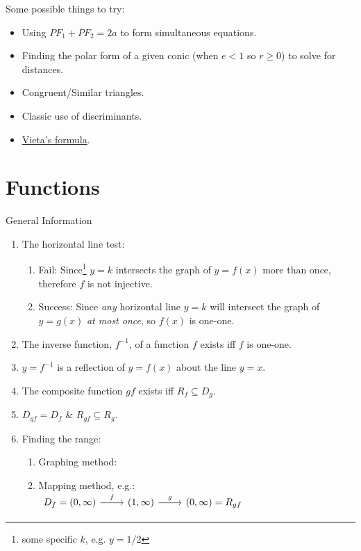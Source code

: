 \documentclass[oneside]{book}
\begin{document}
  \begin{note}
    Some possible things to try:
    \begin{itemize}
      \item Using \(PF_1+PF_2=2a\) to form simultaneous equations.
      \item Finding the polar form of a given conic (when \(e<1\) so \(r \geq 0\)) to solve for distances.
      \item Congruent/Similar triangles.
      \item Classic use of discriminants.
      \item \hyperlink{vieta}{Vieta's formula}.
    \end{itemize}
  \end{note}
\chapter{Functions}
\begin{stbox}{General Information}
  \begin{enumerate}
    \item The horizontal line test: 
    \begin{enumerate}
      \item Fail: Since\footnote{some specific \(k\), e.g. \(y=1/2\)} \(y=k\) intersects the graph of \(y=f(x)\) more than once, therefore \(f\) is not injective.
      \item Success: Since \emph{any} horizontal line \(y=k\) will intersect the graph of \(y=g(x)\) \emph{at most once}, so \(f(x)\) is one-one.
    \end{enumerate}  
    \item The inverse function, \(f^{-1}\), of a function \(f\) exists iff \(f\) is one-one.
    \item \(y=f^{-1}\) is a reflection of \(y=f(x)\) about the line \(y=x\).
    \item The composite function \(gf\) exists iff \(R_f \subseteq D_g\).
    \item \(D_{gf}=D_f\) \& \(R_{gf}\subseteq R_g\).
    \item Finding the range:
    \begin{enumerate}
      \item Graphing method:
      \item Mapping method, e.g.: \(\begin{tikzcd}
        {D_f=(0, \infty)} & {(1,\infty)} & {(0,\infty)=R_{gf}} & {} & {}
        \arrow["f", from=1-1, to=1-2]
        \arrow["g", from=1-2, to=1-3]
      \end{tikzcd}\)
    \end{enumerate} 
  \end{enumerate}
\end{stbox}
\end{document}
